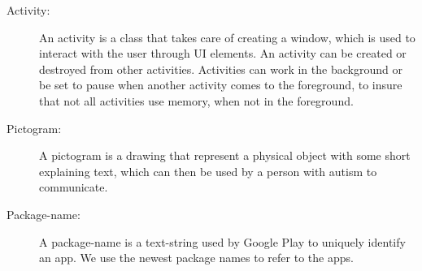 \begin{description}
  \item[Activity:] An activity is a class that takes care of creating a window, which is used to interact with the user through UI elements. An activity can be created or destroyed from other activities. Activities can work in the background or be set to pause when another activity comes to the foreground, to insure that not all activities use memory, when not in the foreground. 
  
  \item[Pictogram:] A pictogram is a drawing that represent a physical object with some short explaining text, which can then be used by a person with autism to communicate.
  
  \item[Package-name:] A package-name is a text-string used by Google Play to uniquely identify an app. We use the newest package names to refer to the apps.
\end{description}